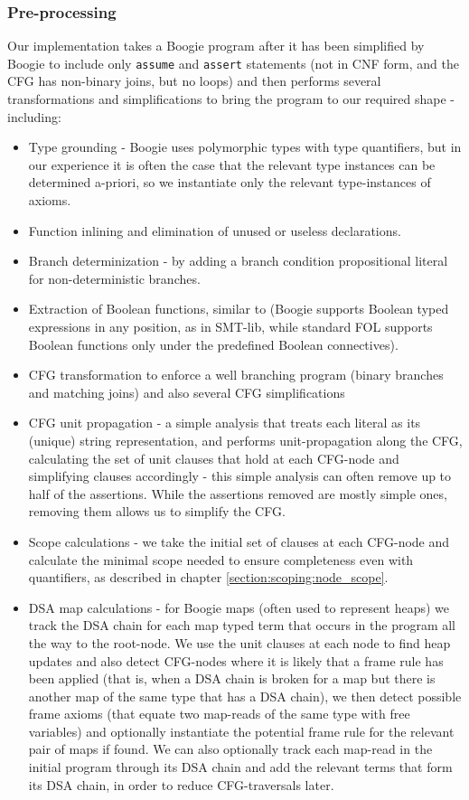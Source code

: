 \subsubsection*{Pre-processing}
Our implementation takes a Boogie program after it has been simplified by Boogie to include only \lstinline|assume| and \lstinline|assert| statements (not in CNF form, and the CFG has non-binary joins, but no loops) and then performs several transformations and simplifications to bring the program to our required shape - including:
\begin{itemize}
\item Type grounding - Boogie uses polymorphic types with type quantifiers, but in our experience it is often the case that the relevant type instances can be determined a-priori, so we instantiate only the relevant type-instances of axioms.
\item Function inlining and elimination of unused or useless declarations.
\item Branch determinization - by adding a branch condition propositional literal for non-deterministic branches.
\item Extraction of Boolean functions, similar to \cite{Kotelnikov:2016:VF:2854065.2854071} (Boogie supports Boolean typed expressions in any position, as in SMT-lib, while standard FOL supports Boolean functions only under the predefined Boolean connectives).
\item CFG transformation to enforce a well branching program (binary branches and matching joins) and also several CFG simplifications
\item CFG unit propagation - a simple analysis that treats each literal as its (unique) string representation, and performs unit-propagation along the CFG, calculating the set of unit clauses that hold at each CFG-node and simplifying clauses accordingly - this simple analysis can often remove up to half of the assertions. While the assertions removed are mostly simple ones, removing them allows us to simplify the CFG.
\item Scope calculations - we take the initial set of clauses at each CFG-node and calculate the minimal scope needed to ensure completeness even with quantifiers, as described in chapter \ref{section:scoping:node_scope}.
\item DSA map calculations - for Boogie maps (often used to represent heaps) we track the DSA chain for each map typed term that occurs in the program all the way to the root-node. We use the unit clauses at each node to find heap updates and also detect CFG-nodes where it is likely that a frame rule has been applied (that is, when a DSA chain is broken for a map but there is another map of the same type that has a DSA chain), we then detect possible frame axioms (that equate two map-reads of the same type with free variables) and optionally instantiate the potential frame rule for the relevant pair of maps if found. We can also optionally track each map-read in the initial program through its DSA chain and add the relevant terms that form its DSA chain, in order to reduce CFG-traversals later.
\end{itemize}

